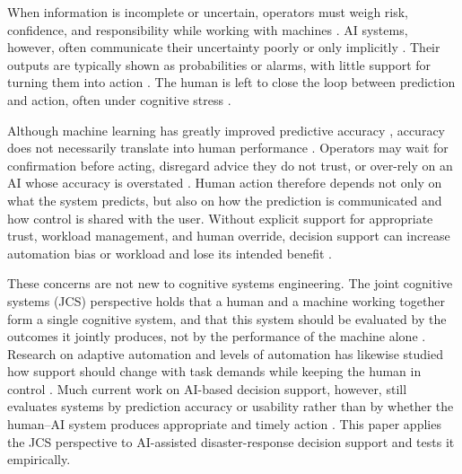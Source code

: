 \documentclass[journal]{IEEEtran}
\theoremstyle{plain}
\theoremstyle{definition}
\begin{document}
When information is incomplete or uncertain, operators must weigh risk, confidence, and responsibility while working with machines \cite{Yang2022THMSReview,Bach2024Access}. AI systems, however, often communicate their uncertainty poorly or only implicitly \cite{McAllister2017IJCAI,Weidinger2022FAccT,Miller2019XRDS}. Their outputs are typically shown as probabilities or alarms, with little support for turning them into action \cite{Miller2019XRDS,Bach2024Access}. The human is left to close the loop between prediction and action, often under cognitive stress \cite{Hodgson2013THMS,Zhang2022THMS}.

Although machine learning has greatly improved predictive accuracy \cite{Mai2024TOS,PerezCerrolaza2024CSUR}, accuracy does not necessarily translate into human performance \cite{Lai2023FAccT,Yang2022THMSReview}. Operators may wait for confirmation before acting, disregard advice they do not trust, or over-rely on an AI whose accuracy is overstated \cite{Hodgson2013THMS,Raji2019AIES,Raji2022CACM,Parasuraman2010}. Human action therefore depends not only on what the system predicts, but also on how the prediction is communicated and how control is shared with the user. Without explicit support for appropriate trust, workload management, and human override, decision support can increase automation bias or workload and lose its intended benefit \cite{Hodgson2013THMS,Zhang2022THMS,Bach2024Access,Lee2004}.

These concerns are not new to cognitive systems engineering. The joint cognitive systems (JCS) perspective holds that a human and a machine working together form a single cognitive system, and that this system should be evaluated by the outcomes it jointly produces, not by the performance of the machine alone \cite{Hollnagel2005JCS,Woods2006JCS}. Research on adaptive automation and levels of automation has likewise studied how support should change with task demands while keeping the human in control \cite{Parasuraman2000LOA,Kaber2004,Scerbo2007}. Much current work on AI-based decision support, however, still evaluates systems by prediction accuracy or usability rather than by whether the human--AI system produces appropriate and timely action \cite{Lai2023FAccT,Muller2022CHIWORK,Yang2022THMSReview,lim2026generativeaidrivenreliabilitylayer}. This paper applies the JCS perspective to AI-assisted disaster-response decision support and tests it empirically.
\end{document}
